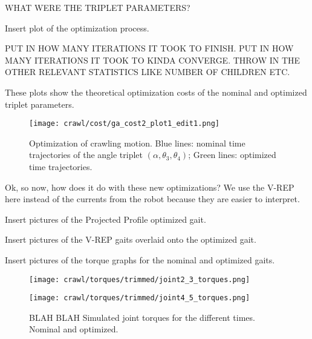 WHAT WERE THE TRIPLET PARAMETERS?

Insert plot of the optimization process.

PUT IN HOW MANY ITERATIONS IT TOOK TO FINISH.
PUT IN HOW MANY ITERATIONS IT TOOK TO KINDA CONVERGE.
THROW IN THE OTHER RELEVANT STATISTICS LIKE NUMBER OF CHILDREN ETC.

These plots show the theoretical optimization costs of the nominal and optimized
triplet parameters. 

\begin{figure}
  \vspace*{-0.12in}
  \centerline{
    \texttt{[image: crawl/cost/ga\_cost2\_plot1\_edit1.png]}
  }
  \vspace*{-0.15in}
  \caption{Optimization of crawling motion. Blue lines: nominal time trajectories of the angle triplet 
           $(\alpha,\theta_3,\theta_4)$; Green lines: optimized time trajectories. }
  \vspace*{-0.17in}
  \label{fig:optimal}
\end{figure}

Ok, so now, how does it do with these new optimizations?
We use the V-REP here instead of the currents from the robot because they are easier to interpret.

Insert pictures of the Projected Profile optimized gait.

Insert pictures of the V-REP gaits overlaid onto the
optimized gait.

Insert pictures of the torque graphs for the nominal and optimized gaits.

\begin{figure}
  \centerline{
    \texttt{[image: crawl/torques/trimmed/joint2\_3\_torques.png]}
  }
  \centerline{
    \texttt{[image: crawl/torques/trimmed/joint4\_5\_torques.png]}
  }
  \caption{BLAH BLAH Simulated joint torques for the different times. Nominal and optimized.}
  \label{fig:vrep_joint_torques_by_joint1}
\end{figure}

